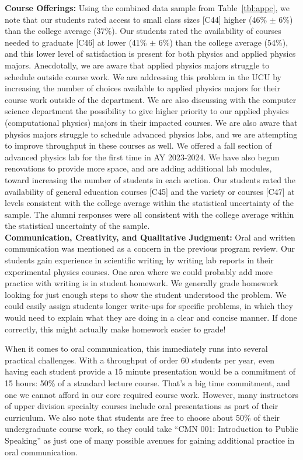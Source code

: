 \documentclass[12pt]{article}
\begin{document}
\noindent
{\bf Course Offerings:} Using the combined data sample from
Table~\ref{tbl:appc}, we note that our students rated access to small
class sizes [C44] higher (46\% $\pm$ 6\%) than the college average
($37\%$).  Our students rated the availability of courses needed to
graduate [C46] at lower (41\% $\pm$ 6\%) than the college average
(54\%), and this lower level of satisfaction is present for both
physics and applied physics majors.  Anecdotally, we are aware that
applied physics majors struggle to schedule outside course work.  We
are addressing this problem in the UCU by increasing the number of
choices available to applied physics majors for their course work
outside of the department.  We are also discussing with the computer
science department the possibility to give higher priority to our
applied physics (computational physics) majors in their impacted
courses.  We are also aware that physics majors struggle to schedule
advanced physics labs, and we are attempting to improve throughput in
these courses as well.  We offered a fall section of advanced physics
lab for the first time in AY 2023-2024.  We have also begun
renovations to provide more space, and are adding additional lab
modules, toward increasing the number of students in each section.
Our students rated the availability of general education courses [C45]
and the variety or courses [C47] at levels consistent with the college
average within the statistical uncertainty of the sample.  The alumni
responses were all consistent with the college average within the
statistical uncertainty of the sample.\\[3pt]

\noindent
{\bf Communication, Creativity, and Qualitative Judgment:} Oral and
written communication was mentioned as a concern in the previous
program review.  Our students gain experience in scientific writing by
writing lab reports in their experimental physics courses.  One area
where we could probably add more practice with writing is in student
homework.  We generally grade homework looking for just enough steps
to show the student understood the problem.  We could easily assign
students longer write-ups for specific problems, in which they would
need to explain what they are doing in a clear and concise manner.  If
done correctly, this might actually make homework easier to grade!

When it comes to oral communication, this immediately runs into
several practical challenges.  With a throughput of order 60 students
per year, even having each student provide a 15 minute presentation
would be a commitment of 15 hours: 50\% of a standard lecture course.
That's a big time commitment, and one we cannot afford in our core
required course work.  However, many instructors of upper division
specialty courses include oral presentations as part of their
curriculum.  We also note that students are free to choose about 50\%
of their undergraduate course work, so they could take ``CMN 001:
Introduction to Public Speaking'' as just one of many possible avenues
for gaining additional practice in oral communication.
\end{document}
